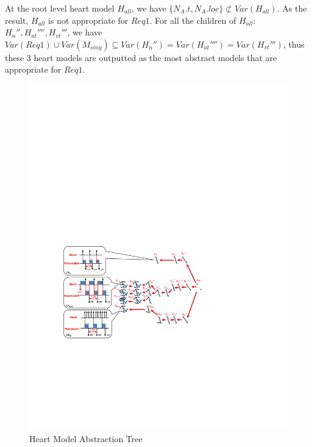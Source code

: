 At the root level heart model $H_{all}$, we have $\{N_A.t,N_A.loc\} \not \subset Var(H_{all})$. As the result, $H_{all}$ is not appropriate for $Req1$. For all the children of $H_{all}$: $H_n'',H_{at}'''',H_{vt}'''$, we have $Var(Req1)\cup Var(M_{sing})\subseteq Var(H_n'')=Var(H_{at}'''')=Var(H_{vt}''')$, thus these 3 heart models are outputted as the most abstract models that are appropriate for $Req1$.
\begin{figure}[!t]
	\centering
	\includegraphics[width=1.05\textwidth]{figs/abs_rev.pdf}
	\caption{\small Heart Model Abstraction Tree}
	\label{fig:CE}
\end{figure}
